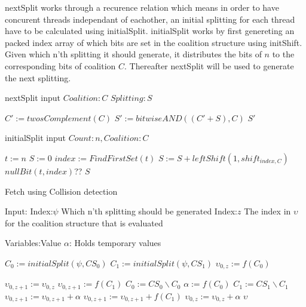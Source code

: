 \documentclass{llncs}
\begin{document}
nextSplit works through a recurence relation which means in order to have 
concurent threads independant of eachother, an initial splitting for each thread have to be calculated using initialSplit. 
initialSplit works by first genereting an packed index array of which bits are set in the coalition structure using initShift.
Given which n'th splitting it should generate, it distributes the bits of $n$ to the corresponding bits of coalition $C$. 
Thereafter nextSplit will be used to generate the next splitting. 




\begin{algorithm}
\caption{ nextSplit input $Coalition:C$ $Splitting:S$}
\begin{algorithmic}[1]
\STATE $C' := twosComplement(C)$
\STATE $S' := bitwiseAND((C'+S),C)$
\RETURN $S'$
\end{algorithmic}
\end{algorithm}

\begin{algorithm}
\caption{initialSplit input $Count:n, Coalition:C$}
\begin{algorithmic}[1]
\STATE $t := n$
\STATE $S := 0$
 {
\STATE $index := FindFirstSet(t)$
\STATE $S := S + leftShift(1,shift_{index,C})$
\STATE $nullBit(t,index)$??
}
\ENDWHILE
\RETURN $S$
\end{algorithmic}
\end{algorithm}

\begin{algorithm}
\caption{Fetch using Collision detection \label{collision}}
Input:
Index:$\psi$ \hfill Which n'th splitting should be generated
Index:$z$ \hfill The index in $\upsilon$ for the coalition structure that is evaluated 

Variables:Value $\alpha $: \hfill Holds temporary values

\begin{algorithmic}[1]
    \STATE $C_{0} := initialSplit(\psi,CS_0)$ \label{lst:line:startcol}
    \STATE $C_{1} := initialSplit(\psi,CS_1)$
    \STATE $\upsilon_{0,z} := f(C_{0})$ \label{lst:line:fetch}
    
     \label{lst:line:firstif}
      \STATE $\upsilon_{0,z+1} := \upsilon_{0,z}$
      \ELSE
      \STATE $\upsilon_{0,z+1} := f(C_{1})$
     \ENDIF \label{lst:line:firstifend}
    \STATE $C_{0} := CS_0\backslash C_{0}$ \label{lst:line:startend}
    \STATE $\alpha := f(C_{0})$
    \STATE $C_{1} := CS_1\backslash C_{1}$
      \STATE $\upsilon_{0,z+1} := \upsilon_{0,z+1}  + \alpha$
    \ELSE
      \STATE $\upsilon_{0,z+1} := \upsilon_{0,z+1} + f(C_{1})$
    \ENDIF
    \STATE $\upsilon_{0,z} := \upsilon_{0,z}  + \alpha$ \label{lst:line:endend}
\RETURN $\upsilon$
\end{algorithmic}
\end{algorithm}
\end{document}
